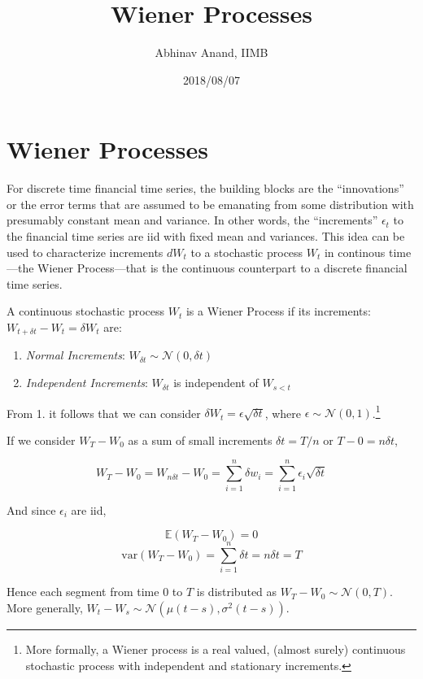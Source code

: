 \documentclass[11pt,]{article}
\title{Wiener Processes}
\author{Abhinav Anand, IIMB}
\date{2018/08/07}
\providecommand{\tightlist}{%
  \setlength{\itemsep}{0pt}\setlength{\parskip}{0pt}}
\let\rmarkdownfootnote\footnote%
\def\footnote{\protect\rmarkdownfootnote}
\begin{document}
\maketitle

\section{Wiener Processes}\label{wiener-processes}

For discrete time financial time series, the building blocks are the
``innovations'' or the error terms that are assumed to be emanating from
some distribution with presumably constant mean and variance. In other
words, the ``increments'' \(\epsilon_t\) to the financial time series
are iid with fixed mean and variances. This idea can be used to
characterize increments \(dW_t\) to a stochastic process \(W_t\) in
continous time---the Wiener Process---that is the continuous counterpart
to a discrete financial time series.

A continuous stochastic process \(W_t\) is a Wiener Process if its
increments: \(W_{t+\delta t}-W_{t}=\delta W_t\) are:

\begin{enumerate}
\def\labelenumi{\arabic{enumi}.}
\tightlist
\item
  \emph{Normal Increments}:
  \(W_{\delta t}\sim \mathcal{N}(0, \delta t)\)
\item
  \emph{Independent Increments}: \(W_{\delta t}\) is independent of
  \(W_{s<t}\)
\end{enumerate}

From 1. it follows that we can consider
\(\delta W_t = \epsilon\sqrt{\delta t}\), where
\(\epsilon\sim \mathcal{N}(0,1)\).\footnote{More formally, a Wiener
  process is a real valued, (almost surely) continuous stochastic
  process with independent and stationary increments.}

If we consider \(W_T-W_0\) as a sum of small increments
\(\delta t = T/n\) or \(T - 0 = n\delta t\),

\[W_T-W_0=W_{n\delta t}-W_0=\sum_{i=1}^n \delta w_i = \sum_{i=1}^n \epsilon_i \sqrt{\delta t}\]

And since \(\epsilon_i\) are iid,

\[\mathbb{E}(W_T-W_0) = 0\]
\[\text{var}(W_T-W_0) = \sum_{i=1}^n \delta t = n\delta t = T\]

Hence each segment from time 0 to \(T\) is distributed as
\(W_T-W_0\sim\mathcal{N}(0, T)\). More generally,
\(W_t-W_s\sim \mathcal{N}(\mu(t-s), \sigma^2(t-s))\).
\end{document}
